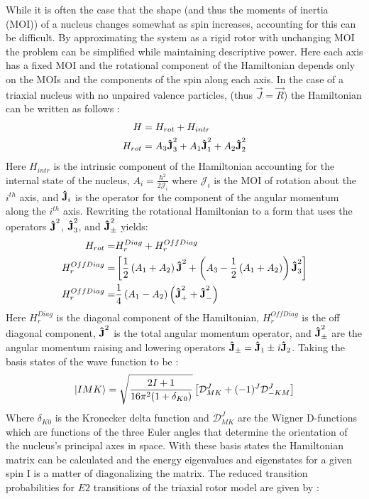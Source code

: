 While it is often the case that the shape (and thus the moments of inertia (MOI)) of a nucleus changes somewhat as spin increases, accounting for this can be difficult. By approximating the system as a rigid rotor with unchanging MOI the problem can be simplified while maintaining descriptive power. Here each axis has a fixed MOI and the rotational component of the Hamiltonian depends only on the MOIs and the components of the spin along each axis. In the case of a triaxial nucleus with no unpaired valence particles, (thus $\vec{J}=\vec{R}$) the Hamiltonian can be written as follows \cite{triaxRotorSol,wobblingGeometry}:
\begin{align}
\label{eqn:chp2-triaxial-rotor-hamiltonian}
H &= H_{rot} + H_{intr} \\
H_{rot}&=A_3\boldsymbol{\hat{\textbf{J}}}_3^2 + A_1\boldsymbol{\hat{\textbf{J}}}_1^2 + A_2\boldsymbol{\hat{\textbf{J}}}_2^2
\end{align}
Here $H_{intr}$ is the intrinsic component of the Hamiltonian accounting for the internal state of the nucleus, $A_i = \frac{\hbar^2}{2 \mathcal{J}_i}$ where $\mathcal{J}_i$ is the MOI of rotation about the $i^{th}$ axis, and $\boldsymbol{\hat{\textbf{J}}}_i$ is the operator for the component of the angular momentum along the $i^{th}$ axis. Rewriting the rotational Hamiltonian to a form that uses the operators $\boldsymbol{\hat{\textbf{J}}}^2$, $\boldsymbol{\hat{\textbf{J}}}^2_3$, and $\boldsymbol{\hat{\textbf{J}}}^2_{\pm}$ yields:
\begin{align}
\label{eqn:chp2-triaxial-rotor-hamiltonian-rewrite}
H_{rot}=& H_{r}^{Diag} + H_{r}^{OffDiag}\\
H_{r}^{OffDiag}=&\left[\frac{1}{2}\left(A_1+A_2\right)\boldsymbol{\hat{\textbf{J}}}^2 + \left(A_3-\frac{1}{2}\left(A_1+A_2\right)\right)\boldsymbol{\hat{\textbf{J}}}^2_3\right]\nonumber\\
H_{r}^{OffDiag}=&\frac{1}{4}\left(A_1-A_2\right)\left(\boldsymbol{\hat{\textbf{J}}}^2_++\boldsymbol{\hat{\textbf{J}}}^2_-\right) \nonumber
\end{align}
Here $H_{r}^{Diag}$ is the diagonal component of the Hamiltonian, $H_{r}^{OffDiag}$ is the off diagonal component, $\boldsymbol{\hat{\textbf{J}}}^2$ is the total angular momentum operator, and $\boldsymbol{\hat{\textbf{J}}}^2_{\pm}$ are the angular momentum raising and lowering operators $\boldsymbol{\hat{\textbf{J}}}_{\pm} = \boldsymbol{\hat{\textbf{J}}}_1\pm\mathit{i}\boldsymbol{\hat{\textbf{J}}}_2$. Taking the basis states of the wave function to be \cite{triaxRotorSol}:
\begin{equation}
\label{eqn:chp2-triaxial-rotor-basis}
\Ket{IMK}= \sqrt{\frac{2I+1}{16\pi^{2}(1+\delta_{K0})}} \left[\mathcal{D}^{J}_{MK} + (-1)^J \mathcal{D}^{J}_{-KM}\right]
\end{equation}
Where $\delta_{K0}$ is the Kronecker delta function and $\mathcal{D}^{J}_{MK}$ are the Wigner D-functions which are functions of the three Euler angles that determine the orientation of the nucleus's principal axes in space. With these basis states the Hamiltonian matrix can be calculated and the energy eigenvalues and eigenstates for a given spin I is a matter of diagonalizing the matrix. The reduced transition probabilities for $E2$ transitions of the triaxial rotor model are given by \cite{wobblingGeometry}:

